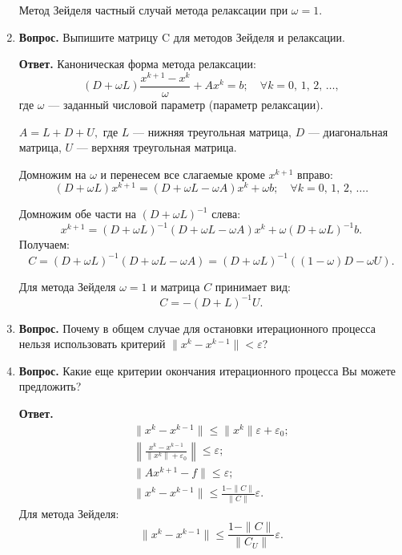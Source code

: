 \documentclass[12pt, a4paper]{article}
\begin{document}
\begin{enumerate}
  Метод Зейделя частный случай метода релаксации при $ \omega = 1 $.
  
  	\item  \textbf{Вопрос.}	Выпишите матрицу C для методов Зейделя и релаксации.
  	
  \textbf{Ответ.}	Каноническая форма метода релаксации:
  	$$	\left( D + \omega L \right) \frac{x^{k + 1} - x^k}{\omega} + A x^k = b;\quad \forall k = 0,\, 1,\, 2,\, \dots,$$ где $\omega$ --- заданный числовой параметр (параметр релаксации).
  	
  	 $ A = L + D + U,$ где $L$ --- нижняя треугольная матрица, $D$ --- диагональная матрица, $U$ --- верхняя треугольная матрица.
  	
  	Домножим на $\omega$ и перенесем все слагаемые кроме $x^{k + 1}$ вправо:
  	$$\left( D + \omega L \right)x^{k + 1} = \left( D + \omega L -\omega A \right)x^k +\omega b; \quad \forall k = 0,\, 1,\, 2,\, \dots. $$
  	
  	Домножим обе части на $ \left( D + \omega L \right)^{-1}$ слева:
  		$$x^{k + 1} = \left( D + \omega L \right)^{-1} \left( D + \omega L -\omega A \right)x^k +\omega \left( D + \omega L \right)^{-1} b. $$
  	Получаем:
  	$$ C = \left( D + \omega L \right)^{-1} \left( D + \omega L -\omega A \right) = \left( D + \omega L \right)^{-1} \left( \left( 1 - \omega \right) D  -\omega U \right).  $$
  	
  	Для метода Зейделя $\omega = 1$ и матрица $C$ принимает вид:
  	$$ C = - \left( D + L \right)^{-1}U.  $$ 
  	
 	\item  \textbf{Вопрос.} Почему в общем случае для остановки итерационного процесса нельзя использовать критерий $\| x^k - x^{k-1} \| < \varepsilon$?
 	
 	\item  \textbf{Вопрос.} Какие еще критерии окончания итерационного процесса Вы можете предложить?
 	
 	 \textbf{Ответ.}
 	\begin{gather*}
 		\| x^k - x^{k - 1} \| \leq \| x^k\| \varepsilon + \varepsilon_0; \\
 		\left\| \frac{ x^k - x^{k - 1}}{\| x^k \| + \varepsilon_0} \right\| \leq \varepsilon; \\
 		 		\| A x^{k + 1} - f \| \leq \varepsilon; \\
 		\| x^k - x^{k - 1}\| \leq \frac{1 - \| C \|}{\| C \|} \varepsilon. 
 	\end{gather*}
 	Для метода Зейделя:
 	$$\| x^k - x^{k - 1} \| \leq \frac{1-\| C \|}{\| C_U \|} \varepsilon.$$
 	
  	
  	
		\end{enumerate}

	
\end{document}
